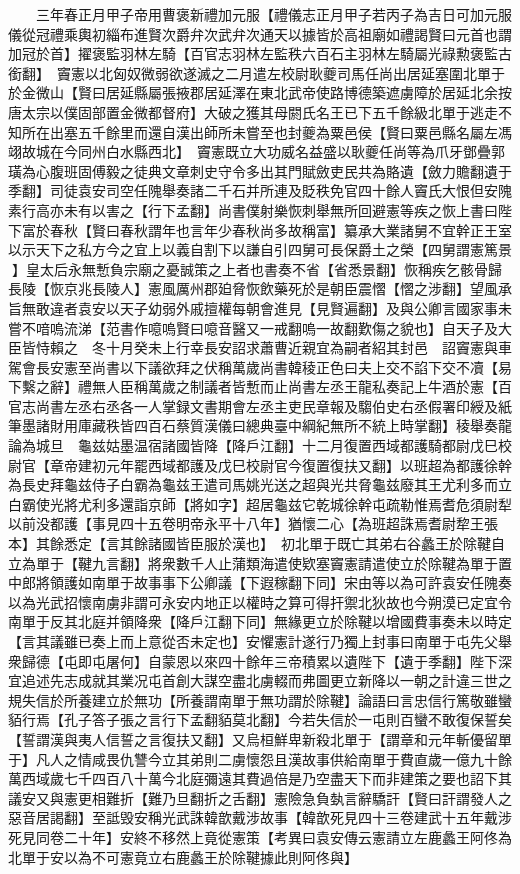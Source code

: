 　　三年春正月甲子帝用曹褒新禮加元服【禮儀志正月甲子若丙子為吉日可加元服儀從冠禮乘輿初緇布進賢次爵弁次武弁次通天以據皆於高祖廟如禮謁賢曰元首也謂加冠於首】擢褒監羽林左騎【百官志羽林左監秩六百石主羽林左騎屬光祿勲褒監古銜翻】　竇憲以北匈奴微弱欲遂滅之二月遣左校尉耿夔司馬任尚出居延塞圍北單于於金微山【賢曰居延縣屬張掖郡居延澤在東北武帝使路博德築遮虜障於居延北余按唐太宗以僕固部置金微都督府】大破之獲其母閼氏名王已下五千餘級北單于逃走不知所在出塞五千餘里而還自漢出師所未嘗至也封夔為粟邑侯【賢曰粟邑縣名屬左馮翊故城在今同州白水縣西北】　竇憲既立大功威名益盛以耿夔任尚等為爪牙鄧疊郭璜為心腹班固傅毅之徒典文章刺史守令多出其門賦斂吏民共為賂遺【斂力贍翻遺于季翻】司徒袁安司空任隗舉奏諸二千石并所連及貶秩免官四十餘人竇氏大恨但安隗素行高亦未有以害之【行下孟翻】尚書僕射樂恢刺舉無所回避憲等疾之恢上書曰陛下富於春秋【賢曰春秋謂年也言年少春秋尚多故稱富】纂承大業諸舅不宜幹正王室以示天下之私方今之宜上以義自割下以謙自引四舅可長保爵土之榮【四舅謂憲篤景】皇太后永無慙負宗廟之憂誠策之上者也書奏不省【省悉景翻】恢稱疾乞骸骨歸長陵【恢京兆長陵人】憲風厲州郡廹脅恢飲藥死於是朝臣震慴【慴之涉翻】望風承旨無敢違者袁安以天子幼弱外戚擅權每朝會進見【見賢遍翻】及與公卿言國家事未嘗不喑嗚流涕【范書作噫嗚賢曰噫音醫又一戒翻嗚一故翻歎傷之貌也】自天子及大臣皆恃賴之　冬十月癸未上行幸長安詔求蕭曹近親宜為嗣者紹其封邑　詔竇憲與車駕會長安憲至尚書以下議欲拜之伏稱萬歲尚書韓稜正色曰夫上交不諂下交不凟【易下繫之辭】禮無人臣稱萬歲之制議者皆慙而止尚書左丞王龍私奏記上牛酒於憲【百官志尚書左丞右丞各一人掌録文書期會左丞主吏民章報及騶伯史右丞假署印綬及紙筆墨諸財用庫藏秩皆四百石蔡質漢儀曰總典臺中綱紀無所不統上時掌翻】稜舉奏龍論為城旦　龜兹姑墨温宿諸國皆降【降戶江翻】十二月復置西域都護騎都尉戊巳校尉官【章帝建初元年罷西域都護及戊巳校尉官今復置復扶又翻】以班超為都護徐幹為長史拜龜兹侍子白霸為龜兹王遣司馬姚光送之超與光共脅龜兹廢其王尤利多而立白霸使光將尤利多還詣京師【將如字】超居龜兹它乾城徐幹屯疏勒惟焉耆危須尉犁以前没都護【事見四十五卷明帝永平十八年】猶懷二心【為班超誅焉耆尉犂王張本】其餘悉定【言其餘諸國皆臣服於漢也】　初北單于既亡其弟右谷蠡王於除鞬自立為單于【鞬九言翻】將衆數千人止蒲類海遣使欵塞竇憲請遣使立於除鞬為單于置中郎將領護如南單于故事事下公卿議【下遐稼翻下同】宋由等以為可許袁安任隗奏以為光武招懷南虜非謂可永安内地正以權時之算可得扞禦北狄故也今朔漠已定宜令南單于反其北庭并領降衆【降戶江翻下同】無緣更立於除鞬以增國費事奏未以時定【言其議雖已奏上而上意從否未定也】安懼憲計遂行乃獨上封事曰南單于屯先父舉衆歸德【屯即屯屠何】自蒙恩以來四十餘年三帝積累以遺陛下【遺于季翻】陛下深宜追述先志成就其業况屯首創大謀空盡北虜輟而弗圖更立新降以一朝之計違三世之規失信於所養建立於無功【所養謂南單于無功謂於除鞬】論語曰言忠信行篤敬雖蠻貊行焉【孔子答子張之言行下孟翻貊莫北翻】今若失信於一屯則百蠻不敢復保誓矣【誓謂漢與夷人信誓之言復扶又翻】又烏桓鮮卑新殺北單于【謂章和元年斬優留單于】凡人之情咸畏仇讐今立其弟則二虜懷怨且漢故事供給南單于費直歲一億九十餘萬西域歲七千四百八十萬今北庭彌遠其費過倍是乃空盡天下而非建策之要也詔下其議安又與憲更相難折【難乃旦翻折之舌翻】憲險急負埶言辭驕訐【賢曰訐謂發人之惡音居謁翻】至詆毁安稱光武誅韓歆戴涉故事【韓歆死見四十三卷建武十五年戴涉死見同卷二十年】安終不移然上竟從憲策【考異曰袁安傳云憲請立左鹿蠡王阿佟為北單于安以為不可憲竟立右鹿蠡王於除鞬據此則阿佟與】

